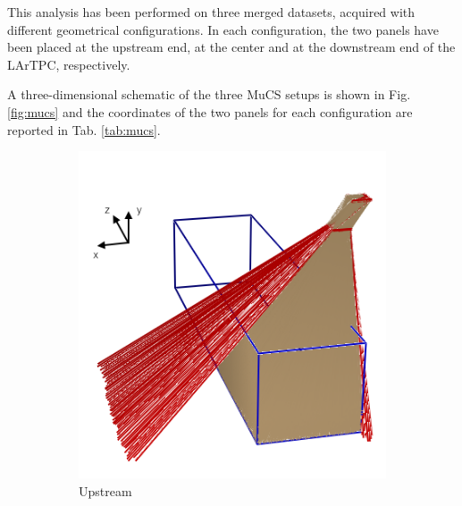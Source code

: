 \documentclass[a4paper]{scrartcl}
\begin{document}
This analysis has been performed on three merged datasets, acquired with different geometrical configurations. In each configuration, the two panels have been placed at the upstream end, at the center and at the downstream end of the LArTPC, respectively.

A three-dimensional schematic of the three MuCS setups is shown in Fig. \ref{fig:mucs} and the coordinates of the two panels for each configuration are reported in Tab. \ref{tab:mucs}.
\begin{figure}[htbp]
  \begin{subfigure}{0.30\textwidth}
    \includegraphics[width=\linewidth]{figures/upstream.png}
    \caption{Upstream} \label{fig:upstream}
  \end{subfigure}
  \begin{subfigure}{0.30\textwidth}

\end{subfigure}
\end{figure}
\end{document}

